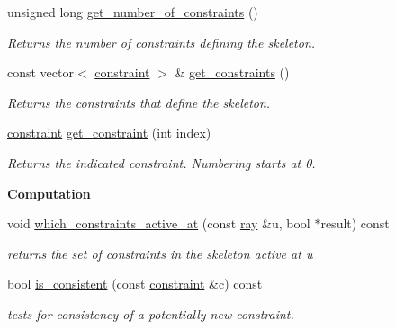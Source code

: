 \begin{Indent}
\begin{DoxyCompactItemize}
unsigned long \hyperlink{classskeleton_a0b75f0ce54e512673169b193955fc58f}{get\+\_\+number\+\_\+of\+\_\+constraints} ()
\begin{DoxyCompactList}\small\item\em Returns the number of constraints defining the skeleton. \end{DoxyCompactList}\item 
\mbox{\label{classskeleton_a29665cf3b04694b349f224e54f93f2db}} 
const vector$<$ \hyperlink{classconstraint}{constraint} $>$ \& \hyperlink{classskeleton_a29665cf3b04694b349f224e54f93f2db}{get\+\_\+constraints} ()
\begin{DoxyCompactList}\small\item\em Returns the constraints that define the skeleton. \end{DoxyCompactList}\item 
\mbox{\label{classskeleton_a8c0ceb21b570a4a4084902a497de79a0}} 
\hyperlink{classconstraint}{constraint} \hyperlink{classskeleton_a8c0ceb21b570a4a4084902a497de79a0}{get\+\_\+constraint} (int index)
\begin{DoxyCompactList}\small\item\em Returns the indicated constraint. Numbering starts at 0. \end{DoxyCompactList}\end{DoxyCompactItemize}
\end{Indent}
\begin{Indent}\textbf{ Computation}\par
\begin{DoxyCompactItemize}
\item 
\mbox{\label{classskeleton_a6b48120d11e7b244c14c748d990d2ade}} 
void \hyperlink{classskeleton_a6b48120d11e7b244c14c748d990d2ade}{which\+\_\+constraints\+\_\+active\+\_\+at} (const \hyperlink{classray}{ray} \&u, bool $\ast$result) const
\begin{DoxyCompactList}\small\item\em returns the set of constraints in the skeleton active at {\ttfamily u} \end{DoxyCompactList}\item 
\mbox{\label{classskeleton_aca399adccf69ea8f9df6cf557526032b}} 
bool \hyperlink{classskeleton_aca399adccf69ea8f9df6cf557526032b}{is\+\_\+consistent} (const \hyperlink{classconstraint}{constraint} \&c) const
\begin{DoxyCompactList}\small\item\em tests for consistency of a potentially new constraint. \end{DoxyCompactList}\end{DoxyCompactItemize}
\end{Indent}
